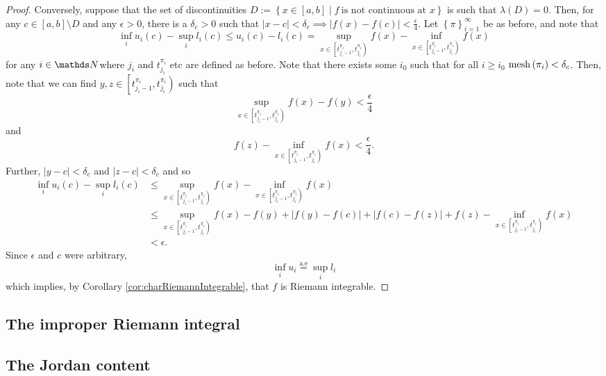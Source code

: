\begin{proof}
Conversely, suppose that the set of discontinuities $D:=\left\{ x\in\left[a,b\right]\mid f\ \text{is not continuous at }x\right\} $
is such that $\lambda\left(D\right)=0.$ Then, for any $c\in\left[a,b\right]\setminus D$
and any $\epsilon>0$, there is a $\delta_{c}>0$ such that $\lvert x-c\rvert<\delta_{c}\implies\lvert f\left(x\right)-f\left(c\right)\rvert<\frac{\epsilon}{4}.$
Let $\left\{ \pi\right\} _{i=1}^{\infty}$ be as before, and note
that 
\[
\inf_{i}u_{i}\left(c\right)-\sup_{i}l_{i}\left(c\right)\leq u_{i}\left(c\right)-l_{i}\left(c\right)=\sup_{x\in\left[t_{j_{i}-1}^{\pi_{i}},t_{j_{i}}^{\pi_{i}}\right)}f\left(x\right)-\inf_{x\in\left[t_{j_{i}-1}^{\pi_{i}},t_{j_{i}}^{\pi_{i}}\right)}f\left(x\right)
\]
for any $i\in\N$where $j_{i}$ and $t_{j_{i}}^{\pi_{i}}$ etc are
defined as before. Note that there exists some $i_{0}$ such that
for all $i\geq i_{0}$ $\mathrm{mesh}\left(\pi_{i}\right)<\delta_{c}$. Then,
note that we can find $y,z\in\left[t_{j_{i}-1}^{\pi_{i}},t_{j_{i}}^{\pi_{i}}\right)$
such that
\[
\sup_{x\in\left[t_{j_{i}-1}^{\pi_{i}},t_{j_{i}}^{\pi_{i}}\right)}f\left(x\right)-f\left(y\right)<\frac{\epsilon}{4}
\]
and
\[
f\left(z\right)-\inf_{x\in\left[t_{j_{i}-1}^{\pi_{i}},t_{j_{i}}^{\pi_{i}}\right)}f\left(x\right)<\frac{\epsilon}{4}.
\]
Further, $\lvert y-c\rvert<\delta_{c}$ and $\lvert z-c\rvert<\delta_{c}$
and so
\begin{align*}
\inf_{i}u_{i}\left(c\right)-\sup_{i}l_{i}\left(c\right) & \leq\sup_{x\in\left[t_{j_{i}-1}^{\pi_{i}},t_{j_{i}}^{\pi_{i}}\right)}f\left(x\right)-\inf_{x\in\left[t_{j_{i}-1}^{\pi_{i}},t_{j_{i}}^{\pi_{i}}\right)}f\left(x\right)\\
 & \leq\sup_{x\in\left[t_{j_{i}-1}^{\pi_{i}},t_{j_{i}}^{\pi_{i}}\right)}f\left(x\right)-f\left(y\right)+\lvert f\left(y\right)-f\left(c\right)\rvert+\lvert f\left(c\right)-f\left(z\right)\rvert+f\left(z\right)-\inf_{x\in\left[t_{j_{i}-1}^{\pi_{i}},t_{j_{i}}^{\pi_{i}}\right)}f\left(x\right)\\
 & <\epsilon.
\end{align*}
Since $\epsilon$ and $c$ were arbitrary,
\[
\inf_{i}u_{i}\stackrel{\text{a.e}}{=}\sup_{i}l_{i}
\]
which implies, by Corollary \ref{cor:charRiemannIntegrable}, that
$f$ is Riemann integrable. 
\end{proof}

\subsection{The improper Riemann integral}

\subsection{The Jordan content}
